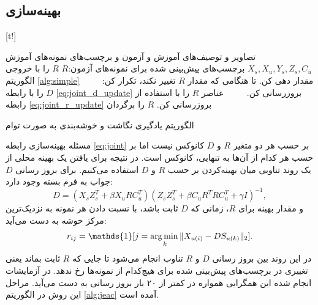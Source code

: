 \subsection{بهینه‌سازی}

[t!]
	\begin{enumerate}[label={\arabic*},itemsep=.1em, parsep=.1em]
 تصاویر و توصیف‌های آموزش و آزمون و برچسب‌های نمونه‌های آموزش $X_s, X_u, Y_s, Z_s, C_u$
 برچسب‌های پیش‌بینی شده برای نمونه‌های آزمون:$R$
 $R$ را با خروجی الگوریتم \ref{alg:simple} مقدار دهی کن.
 تا هنگامی که مقدار $R$ تغییر نکند،  تکرار کن:
 $\qquad$  $D$ را با رابطه \eqref{eq:joint_d_update} بروزرسانی کن.
 $\qquad$ عناصر $R$ را با استفاده از رابطه \eqref{eq:joint_r_update} بروزرسانی کن.
 $R$ را برگردان
\end{enumerate}
\caption{الگوریتم یادگیری نگاشت و خوشه‌بندی به صورت توام}
\label{alg:jeac}

مسئله بهینه‌سازی رابطه \eqref{eq:joint} بر حسب هر دو متغیر $R$ و $D$ کانوکس نیست اما بر حسب هر کدام از آن‌ها به تنهایی، کانوکس است. در نتیجه برای یافتن یک بهینه محلی از یک روند تناوبی میان بهینه‌کردن بر حسب $R$ و $D$ استفاده می‌کنیم.
برای بروز رسانی $D$ جواب به فرم بسته وجود دارد:
\begin{equation} \label{eq:joint_d_update}
  D = (X_s Z_s^T + \beta X_u R C_u^T) (Z_s Z_s^T + \beta C_u R^T R C_u^T  + \gamma I)^{-1},
\end{equation}
و مقدار بهینه برای $R$، زمانی که $D$ ثابت باشد، با نسبت دادن هر نمونه به نزدیک‌ترین مرکز خوشه به دست می‌آید:
\begin{equation} \label{eq:joint_r_update}
  r_{ij} = \mathds{1}[j = \argmin_{k} \lVert X_{u(i)} - D S_{u(k)} \rVert_2 ].
\end{equation}
در این روند بین بروز رسانی $D$ و $R$ تناوب انجام می‌شود تا جایی که $R$ ثابت بماند یعنی تغییری در برچسب‌های پیش‌بینی شده برای هیچ‌کدام از نمونه‌ها رخ ندهد. در آزمایشات انجام شده این همگرایی همواره در کمتر از ۲۰ بار بروز رسانی به دست می‌آید.
مراحل این روش در الگوریتم \ref{alg:jeac} آمده است.

